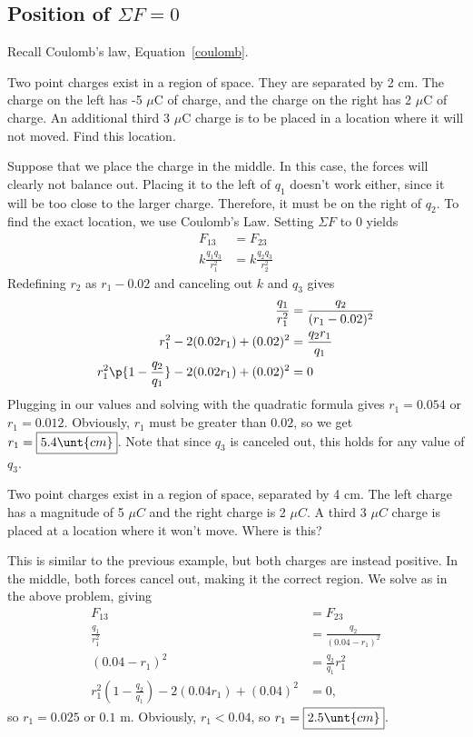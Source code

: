 \documentclass[11pt]{article}
\begin{document}
\subsection{Position of $\Sigma F = 0$}
Recall Coulomb's law, Equation~\ref{coulomb}.
\begin{example}
	Two point charges exist in a region of space. They are separated by 2 cm. The charge on the left has -5 $\mu$C of charge, and the charge on the right has 2 $\mu$C of charge. An additional third 3 $\mu$C charge is to be placed in a location where it will not moved. Find this location.	
\end{example}
\begin{solution}
	Suppose that we place the charge in the middle. In this case, the forces will clearly not balance out. Placing it to the left of $q_1$ doesn't work either, since it will be too close to the larger charge. Therefore, it must be on the right of $q_2$. To find the exact location, we use Coulomb's Law. Setting $\Sigma F$ to 0 yields
	\begin{align*}
		F_{13} &= F_{23} \\
		k\frac{q_1q_3}{r_1^2} &= k\frac{q_2q_3}{r_2^2}
	\end{align*}
	Redefining $r_2$ as $r_1 - 0.02$ and canceling out $k$ and $q_3$ gives
	\begin{align*}
		\frac{q_1}{r_1^2} &= \frac{q_2}{(r_1-0.02)^2} \\
		r_1^2 - 2(0.02r_1) + (0.02)^2 &= \frac{q_2r_1}{q_1} \\
		r_1^2\p{1 - \frac{q_2}{q_1}} - 2(0.02r_1) + (0.02)^2 &= 0
	\end{align*}
	Plugging in our values and solving with the quadratic formula gives $r_1 = 0.054$ or $r_1 = 0.012$. Obviously, $r_1$ must be greater than $0.02$, so we get $r_1 = \boxed{5.4\unt{cm}}$. Note that since $q_3$ is canceled out, this holds for any value of $q_3$.
\end{solution}

\begin{example}
	Two point charges exist in a region of space, separated by 4 cm. The left charge has a magnitude of 5 $\mu C$ and the right charge is 2 $\mu C$. A third 3 $\mu C$ charge is placed at a location where it won't move. Where is this?	
\end{example}
\begin{solution}
	This is similar to the previous example, but both charges are instead positive. In the middle, both forces cancel out, making it the correct region. We solve as in the above problem, giving
	\begin{align*}
		F_{13} &= F_{23} \\
		\frac{q_1}{r_1^2} &= \frac{q_2}{(0.04-r_1)^2} \\
		(0.04-r_1)^2 &= \frac{q_2}{q_1}r_1^2 \\
		r_1^2(1-\frac{q_2}{q_1}) - 2(0.04r_1) + (0.04)^2 &= 0,
	\end{align*}
	so $r_1 = 0.025$ or $0.1$ m. Obviously, $r_1 < 0.04$, so $r_1 = \boxed{2.5\unt{cm}}$.
\end{solution}
\end{document}
